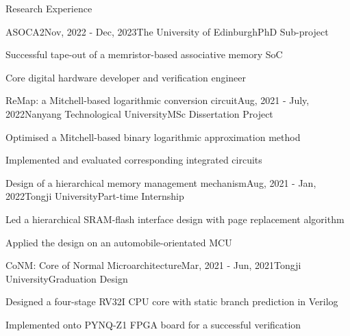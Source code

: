 \documentclass{resume} %
\begin{document}
\begin{rSection}{Research Experience}
	
	\begin{rSubsection}{ASOCA2}{Nov, 2022 - Dec, 2023}{The University of Edinburgh}{PhD Sub-project}
		\item Successful tape-out of a memristor-based associative memory SoC
		\item Core digital hardware developer and verification engineer
	\end{rSubsection}
	
	\begin{rSubsection}{ReMap: a Mitchell-based logarithmic conversion circuit}{Aug, 2021 - July, 2022}{Nanyang Technological University}{MSc Dissertation Project}
		\item Optimised a Mitchell-based binary logarithmic approximation method
		\item Implemented and evaluated corresponding integrated circuits
	\end{rSubsection}

	\begin{rSubsection}{Design of a hierarchical memory management mechanism}{Aug, 2021 - Jan, 2022}{Tongji University}{Part-time Internship}
		\item Led a hierarchical SRAM-flash interface design with page replacement algorithm
		\item Applied the design on an automobile-orientated MCU
	\end{rSubsection}
	
	\begin{rSubsection}{CoNM: Core of Normal Microarchitecture}{Mar, 2021 - Jun, 2021}{Tongji University}{Graduation Design}
		\item Designed a four-stage RV32I CPU core with static branch prediction in Verilog
		\item Implemented onto PYNQ-Z1 FPGA board for a successful verification
	\end{rSubsection}


\end{rSection}
\end{document}
